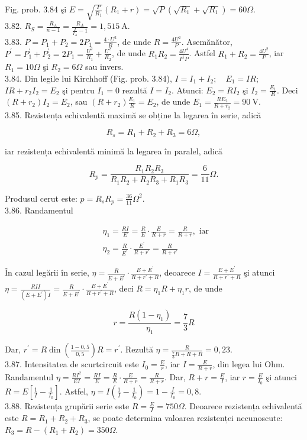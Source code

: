 Fig. prob. 3.84 şi $E=\sqrt{\frac{P}{R_{1}}}\left(R_{1}+r\right)=\sqrt{P}\left(\sqrt{R_{1}}+\sqrt{R_{1}}\right)=60 \Omega$.\\
3.82. $R_{S}=\frac{R_{A}}{n-1}=\frac{R_{A}}{\frac{I}{I_{A}}-1}=1,515 \mathrm{~A}$.\\
3.83. $P=P_{1}+P_{2}=2 P_{1}=\frac{4 \cdot U^{2}}{R}$, de unde $R=\frac{4 U^{2}}{P}$. Asemănător, $P^{\prime}=P_{1}^{\prime}+P_{2}^{\prime}=2 P_{1}=\frac{U^{2}}{R_{1}}+\frac{U^{2}}{R_{2}}$, de unde $R_{1} R_{2}=\frac{4 U^{4}}{P^{\prime} P}$. Astfel $R_{1}+R_{2}=\frac{4 U^{2}}{P}$, iar $R_{1}=10 \Omega$ şi $R_{2}=6 \Omega$ sau invers.\\
3.84. Din legile lui Kirchhoff (Fig. prob. 3.84), $I=I_{1}+I_{2} ; \quad E_{1}=I R$; $I R+r_{2} I_{2}=E_{2}$ şi pentru $I_{1}=0$ rezultă $I=I_{2}$. Atunci: $E_{2}=R I_{2}$ şi $I_{2}=\frac{E_{1}}{R}$. Deci $\left(R+r_{2}\right) I_{2}=E_{2}$, sau $\left(R+r_{2}\right) \frac{E_{1}}{R}=E_{2}$, de unde $E_{1}=\frac{R E_{2}}{R+r_{2}}=90 \mathrm{~V}$.\\
3.85. Rezistența echivalentă maximă se obține la legarea în serie, adică

$$
R_{s}=R_{1}+R_{2}+R_{3}=6 \Omega,
$$

iar rezistența echivalentă minimă la legarea în paralel, adică

$$
R_{p}=\frac{R_{1} R_{2} R_{3}}{R_{1} R_{2}+R_{2} R_{3}+R_{1} R_{3}}=\frac{6}{11} \Omega .
$$

Produsul cerut este: $p=R_{s} R_{p}=\frac{36}{11} \Omega^{2}$.\\
3.86. Randamentul

$$
\begin{aligned}
& \eta_{1}=\frac{R I}{E}=\frac{R}{E} \cdot \frac{E}{R+r}=\frac{R}{R+r}, \text { iar } \\
& \eta_{2}=\frac{R}{E^{\prime}} \cdot \frac{E^{\prime}}{R+r^{\prime}}=\frac{R}{R+r^{\prime}}
\end{aligned}
$$

În cazul legării în serie, $\eta=\frac{R}{E+E^{\prime}} \cdot \frac{E+E^{\prime}}{R+r^{\prime}+R}$, deoarece $I=\frac{E+E^{\prime}}{R+r^{\prime}+R}$ şi atunci $\eta=\frac{R I I}{\left(E+E^{\prime}\right) I}=\frac{R}{E+E^{\prime}} \cdot \frac{E+E^{\prime}}{R+r^{\prime}+R}$, deci $R=\eta_{1} R+\eta_{1} r$, de unde

$$
r=\frac{R\left(1-\eta_{1}\right)}{\eta_{1}}=\frac{7}{3} R
$$

Dar, $r^{\prime}=R \operatorname{din}\left(\frac{1-0,5}{0,5}\right) R=r^{\prime}$. Rezultă $\eta=\frac{R}{\frac{7}{3} R+R+R}=0,23$.\\
3.87. Intensitatea de scurtcircuit este $I_{0}=\frac{E}{r}$, iar $I=\frac{E}{R+r}$, din legea lui Ohm. Randamentul $\eta=\frac{R I^{2}}{E I}=\frac{R I}{E}=\frac{R}{E} \cdot \frac{E}{R+r}=\frac{R}{R+r}$. Dar, $R+r=\frac{E}{I}$, iar $r=\frac{E}{I_{0}}$ şi atunci $R=E\left[\frac{1}{I}-\frac{1}{I_{0}}\right]$. Astfel, $\eta=I\left(\frac{1}{I}-\frac{1}{I_{0}}\right)=1-\frac{I}{I_{0}}=0,8$.\\
3.88. Rezistența grupării serie este $R=\frac{E}{I}=750 \Omega$. Deoarece rezistența echivalentă este $R=R_{1}+R_{2}+R_{3}$, se poate determina valoarea rezistenței necunoscute: $R_{3}=R-\left(R_{1}+R_{2}\right)=350 \Omega$.

